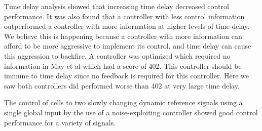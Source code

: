 \documentclass[12pt]{article}
\begin{document}
Time delay analysis showed that increasing time delay decreased control performance. It was also found that a controller with less control information outperformed a controller with more information at higher levels of time delay. We believe this is happening because a controller with more information can afford to be more aggressive to implement its control, and time delay can cause this aggression to backfire. A controller was optimized which required no information in May et al which had a score of 402. This controller should be immune to time delay since no feedback is required for this controller. Here we saw both controllers did performed worse than 402 at very large time delay.

The control of cells to two slowly changing dynamic reference signals using a single global input by the use of a noise-exploiting controller showed good control performance for a variety of signals. 
\end{document}
